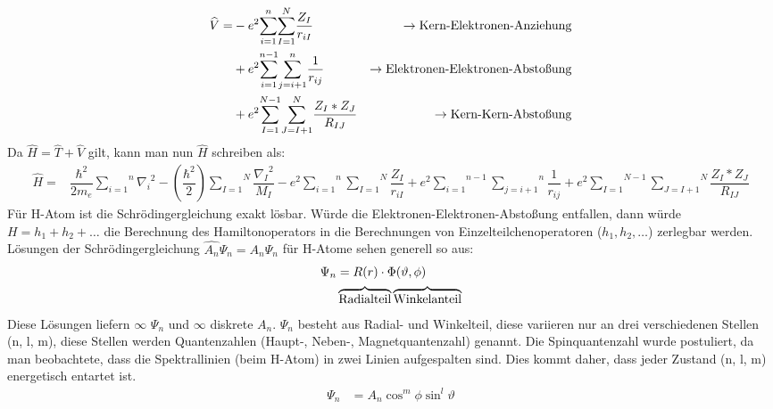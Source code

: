 \documentclass[12pt,a4paper,oneside,normalheadings,abstracton,liststotoc,bibtotoc,titlepage,pdftex]{scrartcl}
\begin{document}
\begin{align}
\widehat{V} =& -e^2 \overset{n}{\underset{i=1}{\sum}} \overset{N}{\underset{I=1}{\sum}} \dfrac{Z_I}{r_{iI}} & \rightarrow \text{Kern-Elektronen-Anziehung} \\
\notag & +e^2 \overset{n-1}{\underset{i=1}{\sum}} \overset{n}{\underset{j=i+1}{\sum}} \dfrac{1}{r_{ij}} & \rightarrow \text{Elektronen-Elektronen-Abstoßung} \\
\notag & +e^2 \overset{N-1}{\underset{I=1}{\sum}} \overset{N}{\underset{J=I+1}{\sum}} \dfrac{Z_I*Z_J}{R_{IJ}} & \rightarrow \text{Kern-Kern-Abstoßung}
\end{align}
Da $\widehat{H} = \widehat{T} + \widehat{V}$ gilt, kann man nun $\widehat{H}$ schreiben als:
\begin{align}
\widehat{H} =& \dfrac{\hbar^2}{2m_e} \overset{n}{\underset{i=1}{\sum}} {\nabla_i}^2 - (\dfrac{\hbar^2}{2}) \overset{N}{\underset{I=1}{\sum}} \dfrac{{\nabla_I}^2}{M_I}-e^2 \overset{n}{\underset{i=1}{\sum}} \overset{N}{\underset{I=1}{\sum}} \dfrac{Z_I}{r_{iI}}+e^2 \overset{n-1}{\underset{i=1}{\sum}} \overset{n}{\underset{j=i+1}{\sum}} \dfrac{1}{r_{ij}}+e^2 \overset{N-1}{\underset{I=1}{\sum}} \overset{N}{\underset{J=I+1}{\sum}} \dfrac{Z_I*Z_J}{R_{IJ}}
\end{align}
Für H-Atom ist die Schrödingergleichung exakt lösbar. Würde die Elektronen-Elektronen-Abstoßung entfallen, dann würde $H=h_1+h_2+\dots$ die Berechnung des Hamiltonoperators in die Berechnungen von Einzelteilchenoperatoren ($h_1,h_2,\dots$) zerlegbar werden.\\
Lösungen der Schrödingergleichung $\widehat{A_n} \Psi_n = A_n \Psi_n $ für H-Atome sehen generell so aus:\\
\begin{align}
\Psi_n& = R(r) \cdot \Phi(\vartheta, \phi)\\
\notag & \overbrace{\text{Radialteil}} \overbrace{\text{Winkelanteil}}
\end{align}
Diese Lösungen liefern $\infty$ $\Psi_n$ und $\infty$ diskrete $A_n$. $\Psi_n$ besteht aus Radial- und Winkelteil, diese variieren nur an drei verschiedenen Stellen (n, l, m), diese Stellen werden Quantenzahlen (Haupt-, Neben-, Magnetquantenzahl) genannt. Die Spinquantenzahl wurde postuliert, da man beobachtete, dass die Spektrallinien (beim H-Atom) in zwei Linien aufgespalten sind. Dies kommt daher, dass jeder Zustand (n, l, m) energetisch entartet ist.
\begin{align}
\Psi_n &= A_n \cos^m \phi \sin^l \vartheta 
\end{align}
\end{document}
